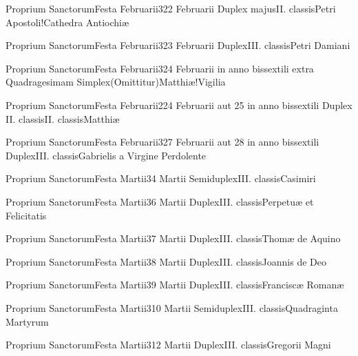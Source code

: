 \documentclass[psalterium-feriale.tex]{subfiles}
\begin{document}
	{Proprium Sanctorum}{Festa Februarii}{3}{22 Februarii}
	{Duplex majus}{II. classis}{Petri Apostoli!Cathedra Antiochiæ}
	{}
	{}
\psalmodiapropria

	{Proprium Sanctorum}{Festa Februarii}{3}{23 Februarii}
	{Duplex}{III. classis}{Petri Damiani}
	{}
	{}

	{Proprium Sanctorum}{Festa Februarii}{3}{24 Februarii in anno bissextili extra Quadragesimam}
	{Simplex}{(Omittitur)}{Matthiæ!Vigilia}
	{}
	{}
\invitferia

	{Proprium Sanctorum}{Festa Februarii}{2}{24 Februarii aut 25 in anno bissextili}
	{Duplex II. classis}{II. classis}{Matthiæ}
	{}
	{}
\psalmodiapropria

	{Proprium Sanctorum}{Festa Februarii}{3}{27 Februarii aut 28 in anno bissextili}
	{Duplex}{III. classis}{Gabrielis a Virgine Perdolente\linebreak\null}
	{}
	{}

	{Proprium Sanctorum}{Festa Martii}{3}{4 Martii}
	{Semiduplex}{III. classis}{Casimiri}
	{}
	{}

	{Proprium Sanctorum}{Festa Martii}{3}{6 Martii}
	{Duplex}{III. classis}{Perpetuæ et Felicitatis}
	{}
	{}

	{Proprium Sanctorum}{Festa Martii}{3}{7 Martii}
	{Duplex}{III. classis}{Thomæ de Aquino}
	{}
	{}

	{Proprium Sanctorum}{Festa Martii}{3}{8 Martii}
	{Duplex}{III. classis}{Joannis de Deo}
	{}
	{}

	{Proprium Sanctorum}{Festa Martii}{3}{9 Martii}
	{Duplex}{III. classis}{Franciscæ Romanæ}
	{}
	{}

	{Proprium Sanctorum}{Festa Martii}{3}{10 Martii}
	{Semiduplex}{III. classis}{Quadraginta Martyrum}
	{}
	{}

	{Proprium Sanctorum}{Festa Martii}{3}{12 Martii}
	{Duplex}{III. classis}{Gregorii Magni}
	{}
	{}
\end{document}
